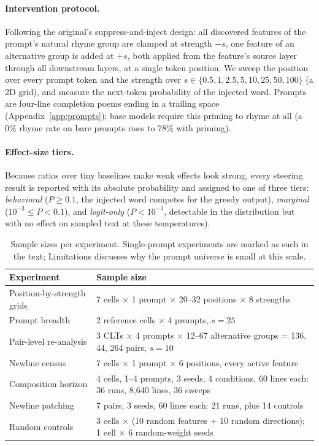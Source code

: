 \documentclass[11pt]{article}
\begin{document}
\paragraph{Intervention protocol.}
Following the original's suppress-and-inject design: all discovered features of the prompt's natural rhyme group are clamped at strength $-s$, one feature of an alternative group is added at $+s$, both applied from the feature's source layer through all downstream layers, at a single token position. We sweep the position over every prompt token and the strength over $s\in\{0.5,1,2.5,5,10,25,50,100\}$ (a 2D grid), and measure the next-token probability of the injected word. Prompts are four-line completion poems ending in a trailing space (Appendix~\ref{app:prompts}); base models require this priming to rhyme at all (a 0\% rhyme rate on bare prompts rises to 78\% with priming).

\paragraph{Effect-size tiers.}
Because ratios over tiny baselines make weak effects look strong, every steering result is reported with its absolute probability and assigned to one of three tiers: \emph{behavioral} ($P\geq0.1$, the injected word competes for the greedy output), \emph{marginal} ($10^{-3}\leq P<0.1$), and \emph{logit-only} ($P<10^{-3}$, detectable in the distribution but with no effect on sampled text at these temperatures).

\begin{table}[t]
\centering\small
\begin{tabular}{@{}R{2.1cm}R{4.3cm}@{}}
\toprule
Experiment & Sample size \\
\midrule
Position-by-strength grids & 7 cells $\times$ 1 prompt $\times$ 20--32 positions $\times$ 8 strengths \\
Prompt breadth & 2 reference cells $\times$ 4 prompts, $s{=}25$ \\
Pair-level re-analysis & 3 CLTs $\times$ 4 prompts $\times$ 12--67 alternative groups = 136, 44, 264 pairs, $s{=}10$ \\
Newline census & 7 cells $\times$ 1 prompt $\times$ 6 positions, every active feature \\
Composition horizon & 4 cells, 1--4 prompts, 3 seeds, 4 conditions, 60 lines each: 36 runs, 8{,}640 lines, 36 sweeps \\
Newline patching & 7 pairs, 3 seeds, 60 lines each: 21 runs, plus 14 controls \\
Random controls & 3 cells $\times$ (10 random features + 10 random directions); 1 cell $\times$ 6 random-weight seeds \\
\bottomrule
\end{tabular}
\caption{Sample sizes per experiment. Single-prompt experiments are marked as such in the text; Limitations discusses why the prompt universe is small at this scale.}
\label{tab:n}
\end{table}
\end{document}
